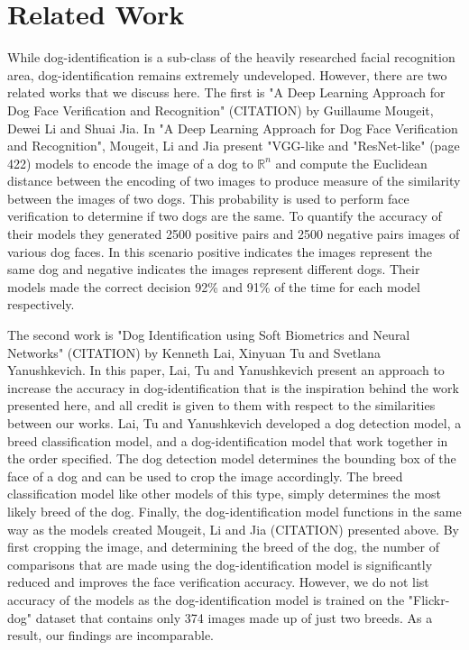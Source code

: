 \documentclass{article}
\begin{document}
\section{Related Work}
	While dog-identification is a sub-class of the heavily researched facial recognition area, dog-identification remains extremely undeveloped.  However, there are two related works that we discuss here.  The first is "A Deep Learning Approach for Dog Face Verification and Recognition" (CITATION)  by  Guillaume Mougeit, Dewei Li and Shuai Jia.  In "A Deep Learning Approach for Dog Face Verification and Recognition", Mougeit, Li and Jia present "VGG-like and "ResNet-like" (page 422) models to encode the image of a dog to $\mathbb{R}^n$ and compute the Euclidean distance between the encoding of two images to produce measure of the similarity between the images of two dogs.  This probability is used to perform face verification to determine if two dogs are the same.  To quantify the accuracy of their models they generated 2500 positive pairs and 2500 negative pairs images of various dog faces.  In this scenario positive indicates the images represent the same dog and negative indicates the images represent different dogs.  Their models made the correct decision 92\% and 91\% of the time for each model respectively.

	The second work is "Dog Identification using Soft Biometrics and Neural Networks" (CITATION) by Kenneth Lai, Xinyuan Tu and Svetlana Yanushkevich.  In this paper, Lai, Tu and Yanushkevich present an approach to increase the accuracy in dog-identification that is the inspiration behind the work presented here, and all credit is given to them with respect to the similarities between our works.  Lai, Tu and Yanushkevich developed a dog detection model, a breed classification model, and a dog-identification model that work together in the order specified.   The dog detection model determines the bounding box of the face of a dog and can be used to crop the image accordingly.  The breed classification model like other models of this type, simply determines the most likely breed of the dog.  Finally, the dog-identification model functions in the same way as the models created  Mougeit, Li and Jia (CITATION) presented above.  By first cropping the image, and determining the breed of the dog, the number of comparisons that are made using the dog-identification model is significantly reduced and improves the face verification accuracy.  However, we do not list accuracy of the models as the dog-identification model is trained on the "Flickr-dog" dataset that contains only 374 images made up of just two breeds.  As a result, our findings are incomparable.
\end{document}
